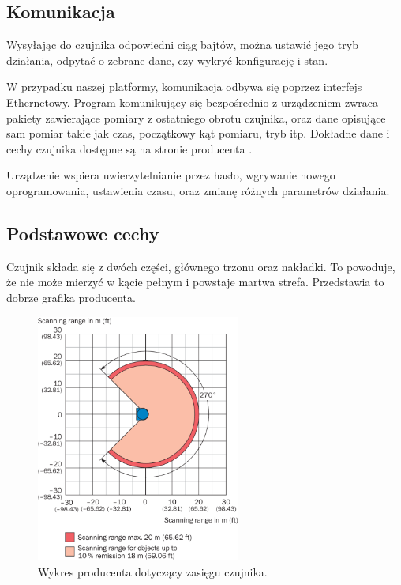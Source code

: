 	\subsection{Komunikacja}
	Wysyłając do czujnika odpowiedni ciąg bajtów, można ustawić jego tryb działania, odpytać o zebrane dane, czy wykryć konfigurację i stan.

	W przypadku naszej platformy, komunikacja odbywa się poprzez interfejs Ethernetowy.
	Program komunikujący się bezpośrednio z urządzeniem zwraca pakiety zawierające pomiary z ostatniego obrotu czujnika, oraz dane 
	opisujące sam pomiar takie jak czas, początkowy kąt pomiaru, tryb itp.
	Dokładne dane i cechy czujnika dostępne są na stronie producenta \cite{sick_website}.

	Urządzenie wspiera uwierzytelnianie przez hasło, wgrywanie nowego oprogramowania,
	ustawienia czasu, oraz zmianę różnych parametrów działania.

	\subsection{Podstawowe cechy}
	Czujnik składa się z dwóch części, głównego trzonu oraz nakładki.
	To powoduje, że nie może mierzyć w kącie pełnym i powstaje martwa strefa.
	Przedstawia to dobrze grafika producenta.
	\begin{figure}[H]
	\centering
	\includegraphics[width=0.6\textwidth]{graphics/sick.png}
	\caption{Wykres producenta dotyczący zasięgu czujnika.}
	\label{fig:lidar}
	\end{figure} 
	
